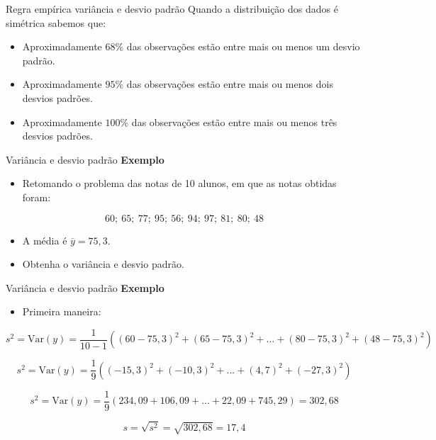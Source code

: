 \documentclass[
  ignorenonframetext,
  serif,
  professionalfont,
  usenames,
  dvipsnames,
  aspectratio = 169]{beamer}
\providecommand{\tightlist}{%
  \setlength{\itemsep}{0pt}\setlength{\parskip}{0pt}}
\renewcommand{\tightlist}{%
  \setlength{\itemsep}{0\baselineskip}
  \setlength{\parskip}{0.25\baselineskip}
}
\begin{document}
\begin{frame}{Regra empírica variância e desvio padrão}
\protect\hypertarget{regra-empuxedrica-variuxe2ncia-e-desvio-padruxe3o}{}
Quando a distribuição dos dados é simétrica sabemos que:

\begin{itemize}
\item
  Aproximadamente \(68\%\) das observações estão entre mais ou menos um
  desvio padrão.
\item
  Aproximadamente \(95\%\) das observações estão entre mais ou menos
  dois desvios padrões.
\item
  Aproximadamente \(100\%\) das observações estão entre mais ou menos
  três desvios padrões.
\end{itemize}
\end{frame}

\begin{frame}{Variância e desvio padrão}
\protect\hypertarget{variuxe2ncia-e-desvio-padruxe3o-1}{}
\textbf{Exemplo}

\begin{itemize}
\tightlist
\item
  Retomando o problema das notas de 10 alunos, em que as notas obtidas
  foram:
\end{itemize}

\[60;\ 65;\ 77;\ 95;\ 56;\ 94;\ 97;\ 81;\ 80;\ 48\]

\begin{itemize}
\item
  A média é \(\overline{y} = 75,3\).
\item
  Obtenha o variância e desvio padrão.
\end{itemize}
\end{frame}

\begin{frame}{Variância e desvio padrão}
\protect\hypertarget{variuxe2ncia-e-desvio-padruxe3o-2}{}
\textbf{Exemplo}

\begin{itemize}
\tightlist
\item
  Primeira maneira:
\end{itemize}

\[
s^2 = \textrm{Var}(y) = \frac{1}{10 - 1} \left ( (60 - 75,3)^2 + (65 - 75,3)^2 + ... + (80 - 75,3)^2 + (48 - 75,3)^2   \right )
\]

\[
s^2 = \textrm{Var}(y) = \frac{1}{9} \left ( (-15,3)^2 + (-10,3)^2 + ... + (4,7)^2 + (-27,3)^2   \right )
\]

\[
s^2 = \textrm{Var}(y) = \frac{1}{9} \left ( 234,09 + 106,09 + ... + 22,09 + 745,29 \right ) = 302,68
\]

\[ s = \sqrt{s^2} = \sqrt{302,68} = 17,4\]
\end{frame}
\end{document}

